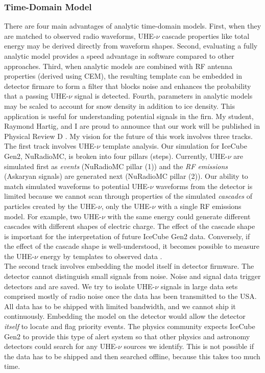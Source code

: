 \documentclass[../../../main.tex]{subfiles}
\begin{document}
\subsubsection{Time-Domain Model}

There are four main advantages of analytic time-domain models. First, when they are matched to observed radio waveforms, UHE-$\nu$ cascade properties like total energy may be derived directly from waveform shapes. Second, evaluating a fully analytic model provides a speed advantage in software compared to other approaches.  Third, when analytic models are combined with RF antenna properties (derived using CEM), the resulting template can be embedded in detector firmare to form a filter that blocks noise and enhances the probability that a passing UHE-$\nu$ signal is detected.  Fourth, parameters in analytic models may be scaled to account for snow density in addition to ice density.  This application is useful for understanding potential signals in the firn.  My student, Raymond Hartig, and I are proud to announce that our work will be published in Physical Review D \cite{time}.  My vision for the future of this work involves three tracks.
\\
\vspace{0.15cm}
The first track involves UHE-$\nu$ template analysis.  Our simulation for IceCube Gen2, NuRadioMC, is broken into four pillars (steps).  Currently, UHE-$\nu$ are simulated first as \textit{events} (NuRadioMC pillar (1)) and the \textit{RF emissions} (Askaryan signals) are generated next (NuRadioMC pillar (2)).  Our ability to match simulated waveforms to potential UHE-$\nu$ waveforms from the detector is limited because we cannot scan through properties of the simulated \textit{cascades} of particles created by the UHE-$\nu$, only the UHE-$\nu$ with a single RF emissions model.  For example, two UHE-$\nu$ with the same energy could generate different cascades with different shapes of electric charge.  The effect of the cascade shape is important for the interpretation of future IceCube Gen2 data.  Conversely, if the effect of the cascade shape is well-understood, it becomes possible to measure the UHE-$\nu$ energy by templates to observed data \cite{time}.
\\
\vspace{0.15cm}
The second track involves embedding the model itself in detector firmware.  The detector cannot distinguish small signals from noise.  Noise and signal data trigger detectors and are saved.  We try to isolate UHE-$\nu$ signals in large data sets comprised mostly of radio noise once the data has been transmitted to the USA.  All data has to be shipped with limited bandwidth, and we cannot ship it continuously.  Embedding the model on the detector would allow the detector \textit{itself} to locate and flag priority events.  The physics community expects IceCube Gen2 to provide this type of alert system so that other physics and astronomy detectors could search for any UHE-$\nu$ sources we identify.  This is not possible if the data has to be shipped and then searched offline, because this takes too much time.
\end{document}
